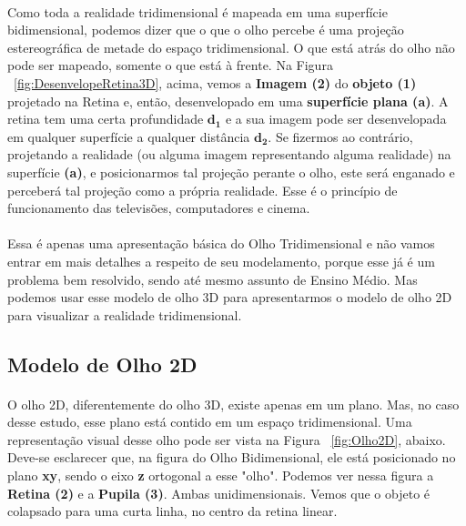 \documentclass{article}
\begin{document}
	\paragraph{}
	Como toda a realidade tridimensional é mapeada em uma superfície bidimensional, podemos dizer que o que o olho percebe é uma projeção estereográfica de metade do espaço tridimensional. O que está atrás do olho não pode ser mapeado, somente o que está à frente. Na Figura ~\ref{fig:DesenvelopeRetina3D}, acima, vemos a \textbf{Imagem (2)} do \textbf{objeto (1)} projetado na Retina e, então, desenvelopado em uma \textbf{superfície plana (a)}. A retina tem uma certa profundidade $\boldsymbol{d_1}$ e a sua imagem pode ser desenvelopada em qualquer superfície a qualquer distância $\boldsymbol{d_2}$. Se fizermos ao contrário, projetando a realidade (ou alguma imagem representando alguma realidade) na superfície \textbf{(a)}, e posicionarmos tal projeção perante o olho, este será enganado e perceberá tal projeção como a própria realidade. Esse é o princípio de funcionamento das televisões, computadores e cinema.
	
	\paragraph{}
	Essa é apenas uma apresentação básica do Olho Tridimensional e não vamos entrar em mais detalhes a respeito de seu modelamento, porque esse já é um problema bem resolvido, sendo até mesmo assunto de Ensino Médio. Mas podemos usar esse modelo de olho 3D para apresentarmos o modelo de olho 2D para visualizar a realidade tridimensional.
	 
	\subsection{Modelo de Olho 2D} \label{mo2d}
	
	\paragraph{}
	O olho 2D, diferentemente do olho 3D, existe apenas em um plano. Mas, no caso desse estudo, esse plano está contido em um espaço tridimensional. Uma representação visual desse olho pode ser vista na Figura ~\ref{fig:Olho2D}, abaixo. Deve-se esclarecer que, na figura do Olho Bidimensional, ele está posicionado no plano \textbf{xy}, sendo o eixo \textbf{z} ortogonal a esse "olho". Podemos ver nessa figura a \textbf{Retina (2)} e a \textbf{Pupila (3)}. Ambas unidimensionais. Vemos que o objeto é colapsado para uma curta linha, no centro da retina linear.
	
\end{document}
